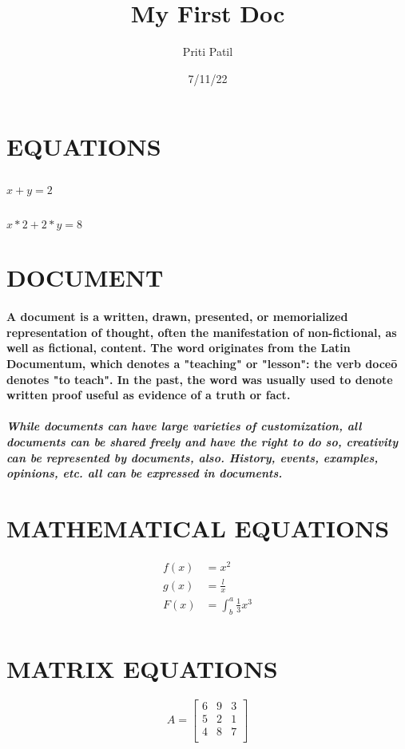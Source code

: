 \documentclass[12pt,a4pages]{article}
\title{My First Doc}
\date{7/11/22}
\author{Priti Patil}
\begin{document}
\maketitle
\newpage
\section{EQUATIONS}
\subsection{}
$x+y=2$ \\
\subsection{}
$x*2+2*y=8$

\newpage
\section{DOCUMENT}
\paragraph{A document is a written, drawn, presented, or memorialized representation of thought, often the manifestation of non-fictional, as well as fictional, content. The word originates from the Latin Documentum, which denotes a "teaching" or "lesson": the verb doceō denotes "to teach". In the past, the word was usually used to denote written proof useful as evidence of a truth or fact.}
\subparagraph{While documents can have large varieties of customization, all documents can be shared freely and have the right to do so, creativity can be represented by documents, also. History, events, examples, opinions, etc. all can be expressed in documents.}
\newpage

\section{MATHEMATICAL EQUATIONS}

\begin{align*}
f(x) &=x^2 \\
g(x) &=\frac{l}{x}\\
F(x) &=\int^a_b \frac{1}{3}x^3\\
\end{align*}

\newpage
\section{MATRIX EQUATIONS}
\[A=
\begin{bmatrix}
6&9&3\\
5&2&1\\
4&8&7\\

\end{bmatrix}
\]
\end{document}

